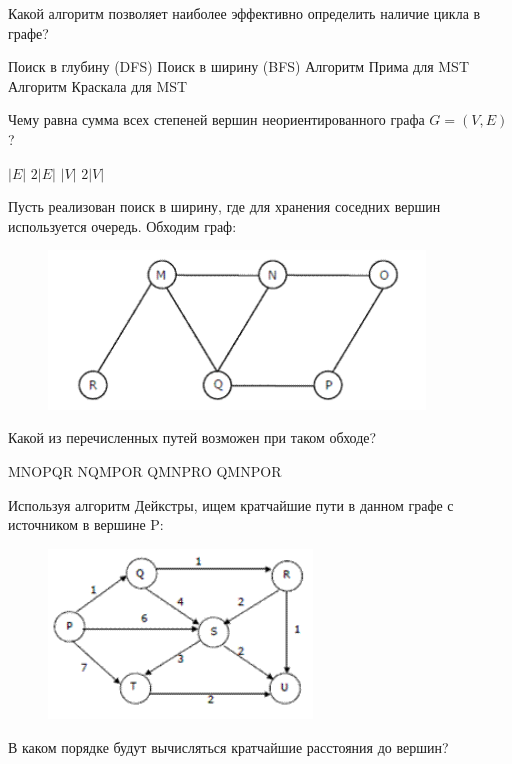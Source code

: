 \documentclass[12pt]{exam}
\providecommand{\abs}[1]{\left\lvert{#1}\right\rvert}
\begin{document}
\begin{questions}
\question[1] Какой алгоритм позволяет наиболее эффективно определить наличие цикла в графе?
\begin{checkboxes}
\CorrectChoice Поиск в глубину (DFS)
\choice Поиск в ширину (BFS)
\choice Алгоритм Прима для MST
\choice Алгоритм Краскала для MST
\end{checkboxes}

\question[1] Чему равна сумма всех степеней вершин неориентированного графа $G=(V,E)$?
\begin{checkboxes}
\choice $\abs{E}$
\CorrectChoice $2\abs{E}$
\choice $\abs{V}$
\choice $2\abs{V}$
\end{checkboxes}

\question[2] Пусть реализован поиск в ширину, где для хранения соседних вершин используется очередь. Обходим граф:
\begin{figure}[H]
  \begin{center}
    \includegraphics[width=10cm]{bfs.png}
  \end{center}
\end{figure}
Какой из перечисленных путей возможен при таком обходе?
\begin{checkboxes}
\choice MNOPQR
\choice NQMPOR
\CorrectChoice QMNPRO
\choice QMNPOR
\end{checkboxes}

\question[2] Используя алгоритм Дейкстры, ищем кратчайшие пути в данном графе с источником в вершине P:
\begin{figure}[H]
  \begin{center}
    \includegraphics[width=7cm]{shortest.png}
  \end{center}
\end{figure}
В каком порядке будут вычисляться кратчайшие расстояния до вершин?
\begin{checkboxes}
\end{checkboxes}

\nomorequestions

\end{questions}
\end{document}
